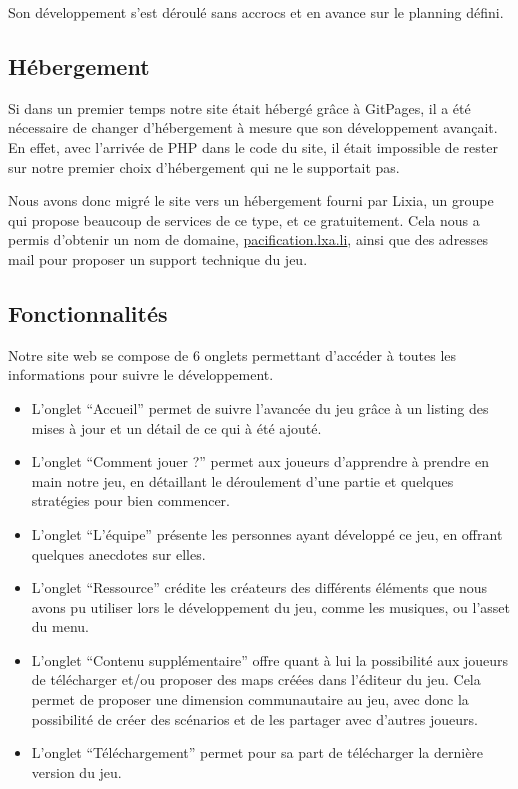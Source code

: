 \documentclass[12pt]{report}
\begin{document}
Son développement s’est déroulé sans accrocs et en avance sur le planning défini.

\subsection{Hébergement}

Si dans un premier temps notre site était hébergé grâce à GitPages, il a été
nécessaire de changer d’hébergement à mesure que son développement avançait. En
effet, avec l’arrivée de PHP dans le code du site, il était impossible de rester sur
notre premier choix d'hébergement qui ne le supportait pas.

Nous avons donc migré le site vers un hébergement fourni par Lixia, un groupe
qui propose beaucoup de services de ce type, et ce gratuitement. Cela nous a permis 
d’obtenir un nom de domaine, \url{pacification.lxa.li}, ainsi que des adresses mail pour 
proposer un support technique du jeu. 

\subsection{Fonctionnalités}

Notre site web se compose de 6 onglets permettant d'accéder à toutes les
informations pour suivre le développement.

\begin{itemize}
	\item L’onglet “Accueil” permet de suivre l’avancée du jeu grâce à un listing 
	des mises à jour et un détail de ce qui à été ajouté.
	\item L’onglet “Comment jouer ?” permet aux joueurs d’apprendre à prendre en main 
	notre jeu, en détaillant le déroulement d’une partie et quelques stratégies pour bien 
	commencer.
	\item L’onglet “L’équipe” présente les personnes ayant développé ce jeu, en offrant quelques 
	anecdotes sur elles.
	\item L’onglet “Ressource” crédite les créateurs des différents éléments que nous avons pu 
	utiliser lors le développement du jeu, comme  les musiques, ou l’asset du menu.
	\item L’onglet “Contenu supplémentaire” offre quant à lui la possibilité aux joueurs de télécharger 
	et/ou proposer des maps créées dans l’éditeur du jeu. Cela permet de proposer une dimension 
	communautaire au jeu, avec donc la possibilité de créer des scénarios et de les partager avec 
	d'autres joueurs.
	\item L’onglet “Téléchargement” permet pour sa part de télécharger la dernière version du jeu.
\end{itemize}
\end{document}
